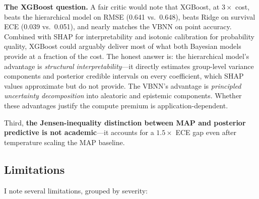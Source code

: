\documentclass[10pt, letterpaper]{article}
\begin{document}
\textbf{The XGBoost question.} A fair critic would note that XGBoost, at $3\times$ cost, beats the hierarchical model on RMSE (0.641 vs.\ 0.648), beats Ridge on survival ECE (0.039 vs.\ 0.051), and nearly matches the VBNN on point accuracy. Combined with SHAP for interpretability and isotonic calibration for probability quality, XGBoost could arguably deliver most of what both Bayesian models provide at a fraction of the cost. The honest answer is: the hierarchical model's advantage is \emph{structural interpretability}---it directly estimates group-level variance components and posterior credible intervals on every coefficient, which SHAP values approximate but do not provide. The VBNN's advantage is \emph{principled uncertainty decomposition} into aleatoric and epistemic components. Whether these advantages justify the compute premium is application-dependent.

Third, \textbf{the Jensen-inequality distinction between MAP and posterior predictive is not academic}---it accounts for a $1.5\times$ ECE gap even after temperature scaling the MAP baseline.

\subsection{Limitations}

I note several limitations, grouped by severity:
\end{document}
